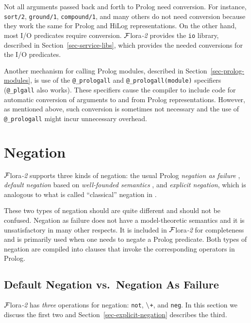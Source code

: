 \documentclass[11pt]{article}
\newcommand{\FLORA}{{\mbox{\sc ${\cal F}${lora}\rm\emph{-2}}}\xspace}
\newcommand{\NAF}{\mbox{\tt \ensuremath{\tt\backslash}+}\xspace}
\newcommand{\TNOT}{{{\tt not}}\xspace}
\begin{document}
Not all arguments passed back and forth to Prolog need conversion. For
instance, {\tt sort/2}, {\tt ground/1}, {\tt compound/1}, and many others
do not need conversion because they work the same for Prolog and HiLog
representations. On the other hand, most I/O predicates require conversion.
\FLORA provides the {\tt io} library, described in
Section~\ref{sec-service-libs}, which provides the needed conversions for
the I/O predicates.


Another mechanism for calling Prolog modules, described in
Section~\ref{sec-prolog-modules}, is use of the {\tt @\_prologall} and
{\tt @\_prologall(module)} specifiers ({\tt @\_plgall} also works). These
specifiers cause the compiler to include code for automatic conversion of
arguments to and from Prolog representations. However, as mentioned above,
such conversion is sometimes not necessary and the use of {\tt
  @\_prologall} might incur unnecessary overhead.



\section{Negation} \label{sec:negation}


\FLORA supports three kinds of negation: the usual Prolog \emph{negation as
  failure} \cite{Cla78}, \emph{default negation} based on
\emph{well-founded semantics}
\cite{gelder-alternating-89,gelder-ross-schlipf-91}, and \emph{explicit
  negation}, which is analogous to what is called ``classical'' negation in
\cite{gelfond91classical}.
 
These two types of negation should are quite different and should not be
confused. Negation as failure does not have a model-theoretic semantics
and it is unsatisfactory in many other respects. It is included in \FLORA
for completeness and is primarily used when one needs to negate a Prolog
predicate.
Both types of negation
are compiled into clauses that invoke the corresponding operators in
Prolog.

\subsection{Default Negation vs.~Negation As Failure}\label{sec-negation}
\index{\TNOT}
\index{\NAF}
\FLORA has \emph{three} operations for negation: \TNOT, \NAF, and {\tt neg}.
In this section we discuss the first two and
Section~\ref{sec-explicit-negation} describes the third.
\end{document}
